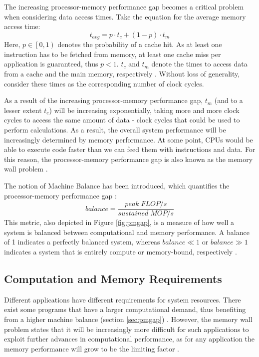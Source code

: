 The increasing processor-memory performance gap becomes a critical problem when considering data access times. Take the equation for the average memory access time:
\begin{equation}\label{eq:avg_mem_time}
t_{avg} = p \cdot t_c + (1-p) \cdot t_m
\end{equation}
Here, $p \in \left[0,1\right)$ denotes the probability of a cache hit. As at least one instruction has to be fetched from memory, at least one cache miss per application is guaranteed, thus $p < 1$. $t_c$ and $t_m$ denote the times to access data from a cache and the main memory, respectively \cite{wulf1995hitting, mahapatra1999processor}. Without loss of generality, consider these times as the corresponding number of clock cycles.

As a result of the increasing processor-memory performance gap, $t_m$ (and to a lesser extent $t_c$) will be increasing exponentially, taking more and more clock cycles to access the same amount of data - clock cycles that could be used to perform calculations. As a result, the overall system performance will be increasingly determined by memory performance. At some point, CPUs would be able to execute code faster than we can feed them with instructions and data. For this reason, the processor-memory performance gap is also known as the memory wall problem \cite{wulf1995hitting, mckee2004reflections, mahapatra1999processor}.

The notion of Machine Balance has been introduced, which quantifies the processor-memory performance gap \cite{mccalpin1997survey, mccalpin2016memory}:
\begin{equation}\label{eq:machine_balance}
	balance = \frac{peak\; FLOP/s}{sustained\; MOP/s}
\end{equation}
This metric, also depicted in Figure \ref{fig:pmgap}, is a measure of how well a system is balanced between computational and memory performance. A balance of 1 indicates a perfectly balanced system, whereas $balance \ll 1$ or $balance \gg 1$  indicates a system that is entirely compute or memory-bound, respectively \cite{mccalpin1997survey, mccalpin2016memory}.

\subsection{Computation and Memory Requirements}\label{sec:comp_mem_req}
Different applications have different requirements for system resources. There exist some programs that have a larger computational demand, thus benefiting from a higher machine balance (section \ref{sec:pmgap}) \cite{mccalpin2016memory}. However, the memory wall problem states that it will be increasingly more difficult for such applications to exploit further advances in computational performance, as for any application the memory performance will grow to be the limiting factor \cite{wulf1995hitting, mckee2004reflections}.

